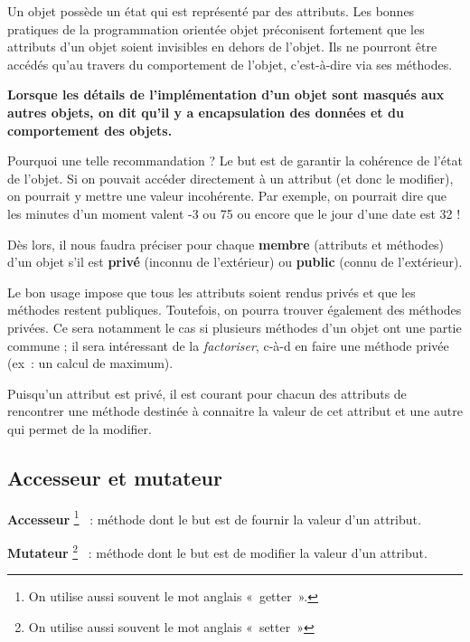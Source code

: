 	Un objet possède un état qui est représenté par des attributs. 
	Les bonnes pratiques de la programmation orientée objet préconisent
	fortement que les attributs d'un objet soient
	invisibles en dehors de l'objet. 
	Ils ne pourront être accédés qu'au travers 
	du comportement de l'objet, 
	c'est-à-dire via ses méthodes.
	
	\clearpage
	\textbf{%
		Lorsque les détails de l'implémentation
		d'un objet sont masqués aux autres objets, on dit
		qu'il y a \textbf{encapsulation} des données et du
		comportement des objets.
	}
	
	Pourquoi une telle recommandation ? 
	Le but est de garantir la cohérence de l'état de l'objet. 
	Si on pouvait accéder directement à un attribut 
	(et donc le modifier), 
	on pourrait y mettre une valeur incohérente. 
	Par exemple, on pourrait dire que les minutes d'un moment 
	valent -3 ou 75 ou encore que le jour d'une date est 32 !
	
	Dès lors, il nous faudra préciser pour chaque \textbf{membre} 
	(attributs et méthodes) d'un objet s'il est
	\textbf{privé} (inconnu de l'extérieur) ou
	\textbf{public} (connu de l'extérieur). 
	
	Le bon usage impose que tous les attributs soient rendus privés 
	et que les méthodes restent publiques. 
	Toutefois, on pourra trouver également des méthodes privées. 
	Ce sera notamment le cas si plusieurs méthodes d'un objet 
	ont une partie commune ; 
	il sera intéressant de la \textit{factoriser}, 
	c-à-d en faire une méthode privée (ex~: un calcul de maximum).
	
	Puisqu'un attribut est privé,
	il est courant pour chacun des attributs de rencontrer 
	une méthode destinée à connaitre la valeur de cet attribut 
	et une autre qui permet de la modifier.

	\subsection{Accesseur et mutateur}
	
	
	\textbf{Accesseur}%
	\footnote{On utilise aussi souvent le mot anglais «~getter~».}%
	~: méthode dont le but est de fournir la valeur d'un attribut.

	\textbf{Mutateur}%
	\footnote{On utilise aussi souvent le mot anglais «~setter~»}%
	~: méthode dont le but est de modifier la valeur d'un attribut.

